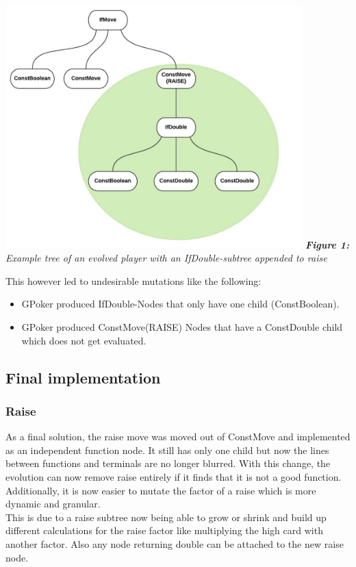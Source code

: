 \documentclass[12pt,fleqn,a4paper]{article}
\begin{document}
\begin{center}
	\includegraphics[width=0.86\textwidth]{raise_subtree_1.png}
	\textit{\textbf{Figure 1: }Example tree of an evolved player with an IfDouble-subtree appended to raise}
\end{center}

This however led to undesirable mutations like the following:
\begin{itemize}
	\item GPoker produced IfDouble-Nodes that only have one child
	(ConstBoolean).
	\item GPoker produced ConstMove(RAISE) Nodes that have a
	ConstDouble child which does not get evaluated.
\end{itemize}

\newpage
\subsection{Final implementation}
\subsubsection{Raise}
As a final solution, the raise move was moved out of ConstMove and implemented as an independent function node. It still has only one child but now the lines between functions and terminals are no longer blurred. With this change, the evolution can now remove raise entirely if it finds that it is not a good function. Additionally, it is now easier to mutate the factor of a raise which is more dynamic and granular. \\
This is due to a raise subtree now being able to grow or shrink and build up different calculations for the raise factor like multiplying the high card with another factor. Also any node returning double can be attached to the new raise node.
\end{document}
